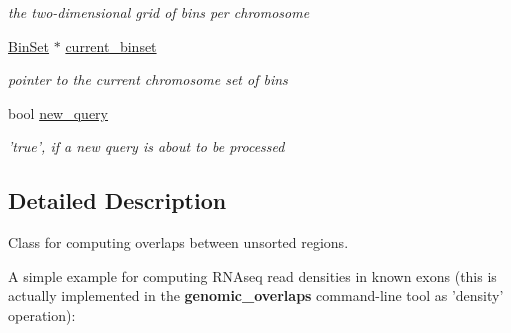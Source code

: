 \begin{CompactItemize}
\begin{CompactList}\small\item\em the two-dimensional grid of bins per chromosome \item\end{CompactList}\item 
\hypertarget{classUnsortedGenomicRegionSetOverlaps_6bbb87f3c66d04527f06a5761df1ab56}{
\hyperlink{classUnsortedGenomicRegionSetOverlaps_0f0857dd93ad3c047d1f5056a57edc14}{BinSet} $\ast$ \hyperlink{classUnsortedGenomicRegionSetOverlaps_6bbb87f3c66d04527f06a5761df1ab56}{current\_\-binset}}
\label{classUnsortedGenomicRegionSetOverlaps_6bbb87f3c66d04527f06a5761df1ab56}

\begin{CompactList}\small\item\em pointer to the current chromosome set of bins \item\end{CompactList}\item 
\hypertarget{classUnsortedGenomicRegionSetOverlaps_bafc544ce2c677ce071fa4e30ec2ecaf}{
bool \hyperlink{classUnsortedGenomicRegionSetOverlaps_bafc544ce2c677ce071fa4e30ec2ecaf}{new\_\-query}}
\label{classUnsortedGenomicRegionSetOverlaps_bafc544ce2c677ce071fa4e30ec2ecaf}

\begin{CompactList}\small\item\em 'true', if a new query is about to be processed \item\end{CompactList}\end{CompactItemize}


\subsection{Detailed Description}
Class for computing overlaps between unsorted regions. 

A simple example for computing RNAseq read densities in known exons (this is actually implemented in the {\bf genomic\_\-overlaps} command-line tool as 'density' operation): 

